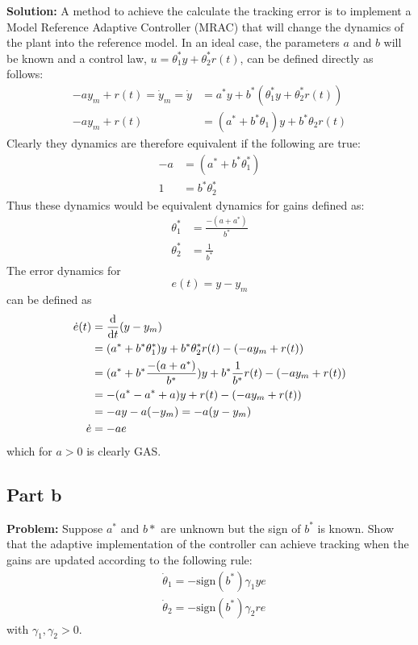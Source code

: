 \documentclass[letter]{article}
\begin{document}
\noindent
\textbf{Solution:}
A method to achieve the calculate the tracking error is to implement a Model Reference Adaptive Controller (MRAC) that will change the dynamics of the plant into the reference model. In an ideal case, the parameters $a$ and $b$ will be known and a control law, $u = \theta_1^* y + \theta_2^* r(t)$, can be defined directly as follows:
\begin{align}
	-a y_m + r(t) = \dot{y}_m = \dot{y}
	&= a^* y + b^* (\theta_1^* y + \theta_2^* r(t))\\
	-a y_m + r(t)
	&= (a^* + b^* \theta_1) y + b^* \theta_2 r(t)
\end{align}
Clearly they dynamics are therefore equivalent if the following are true:
\begin{align}
	- a &= (a^* + b^* \theta_1^*)\\
	1	&= b^* \theta_2^*
\end{align}
Thus these dynamics would be equivalent dynamics for gains defined as:
\begin{align}
	\theta_1^* &= \frac{-(a + a^*)}{b^*}\\
	\theta_2^* &= \frac{1}{b^*}
\end{align}
The error dynamics for $$e(t) = y - y_m$$ can be defined as
\begin{align}
	\dot{e}(t) &= \dv{t} (y - y_m)\\
	&= (a^* + b^* \theta_1^*) y + b^* \theta_2^* r(t) - ( -a y_m + r(t))\\
	&= (a^* + b^* \frac{-(a + a^*)}{b^*}) y + b^* \frac{1}{b^*} r(t) - ( -a y_m + r(t))\\
	&= -(a^* - a^* + a)y + r(t) - (-a y_m + r(t))\\
	&= -a y - a (-y_m) = -a (y-y_m)\\
	\dot{e} &= - a e\label{eq:dot_e}
\end{align}
which for $a>0$ is clearly GAS.


\subsection{Part b}
\textbf{Problem:}
Suppose $a^*$ and $b*$ are unknown but the sign of $b^*$ is known. Show that the adaptive implementation of the controller can achieve tracking when the gains are updated according to the following rule:
\begin{equation} \label{eq:dot_theta}
	\begin{aligned}
		& \dot{\theta}_1 = - \text{sign}(b^*) \gamma_1 y e\\
		& \dot{\theta}_2 = - \text{sign}(b^*) \gamma_2 r e
	\end{aligned}
\end{equation}
with $\gamma_1, \gamma_2 > 0$.\\
\end{document}
